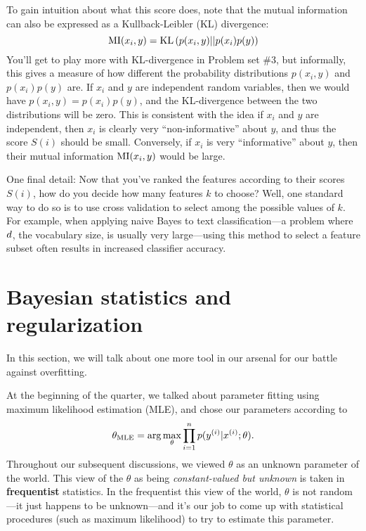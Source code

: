 \documentclass{article}
\begin{document}
To gain intuition about what this score does, note that the mutual information 
can also be expressed as a Kullback-Leibler (KL) divergence:
\[
{\rm MI}(x_i,y) = {\rm KL}\left(p(x_i,y) || p(x_i) p(y)\right)
\]
You'll get to play more with KL-divergence in Problem set \#3, but informally, 
this gives a measure of how different the probability 
distributions 
$p(x_i,y)$ and $p(x_i) p(y)$ are.  If $x_i$ and $y$ are independent random variables,
then we would have $p(x_i,y) = p(x_i) p(y)$, and the KL-divergence between the 
two distributions will be zero.  This is consistent with the idea if $x_i$ and $y$
are independent, then $x_i$ is clearly very ``non-informative'' about $y$, and thus
the score $S(i)$ should be small.  Conversely, if $x_i$ is very ``informative''
about $y$, then their mutual information ${\rm MI}(x_i,y)$ would be large. 

One final detail: Now that you've ranked the features according to their scores $S(i)$,
how do you decide how many features $k$ to choose?  Well, one standard way to 
do so is to use cross validation to select among the possible values of $k$.  For example,
when applying naive Bayes to text classification---a problem where ${d}$, the vocabulary
size, is usually very large---using this method to select a feature subset often 
results in increased classifier accuracy. 


\section{Bayesian statistics and regularization}

In this section, we will talk about one more tool in our arsenal for 
our battle against overfitting. 

At the beginning of the quarter, we talked about parameter fitting 
using maximum likelihood estimation (MLE), and chose our parameters according to
\[
\theta_{\rm MLE} = \arg \max_\theta \prod_{i=1}^{n} p(y^{(i)} | x^{(i)};\theta).
\]
Throughout our subsequent discussions, we viewed $\theta$ as an unknown
parameter of the world.
This view of the $\theta$ as being \emph{constant-valued
but unknown} is taken in {\bf frequentist} statistics.  
In the frequentist this view of the world, $\theta$ is 
not random---it just happens to be unknown---and it's our job to come 
up with statistical procedures (such as maximum likelihood) to try to 
estimate this parameter.  
\end{document}
